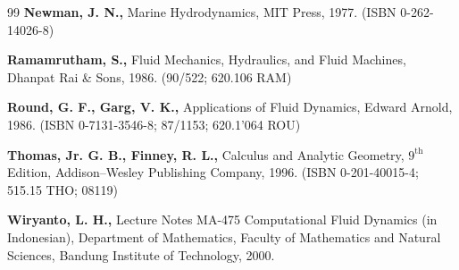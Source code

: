 \documentclass[12pt,a4paper]{report}
\begin{document}
\begin{thebibliography}{99}
  \textbf{Newman, J. N.,} Marine Hydrodynamics, MIT Press,
1977. (ISBN 0-262-14026-8)

  \textbf{Ramamrutham, S.,} Fluid Mechanics, Hydraulics, and
Fluid Machines, Dhanpat Rai \& Sons, 1986. (90/522; 620.106 RAM)

  \textbf{Round, G. F., Garg, V. K.,} Applications of Fluid
Dynamics, Edward Arnold, 1986. (ISBN 0-7131-3546-8; 87/1153; 620.1'064 ROU)

  \textbf{Thomas, Jr. G. B., Finney, R. L.,} Calculus and
Analytic Geometry, $9^\text{th}$ Edition, Addison--Wesley Publishing Company,
1996. (ISBN 0-201-40015-4; 515.15 THO; 08119)

  \textbf{Wiryanto, L. H.,} Lecture Notes MA-475 Computational Fluid Dynamics (in Indonesian), Department of Mathematics, Faculty of Mathematics and Natural Sciences, Bandung Institute of Technology, 2000.
\end{thebibliography}
\end{document}
